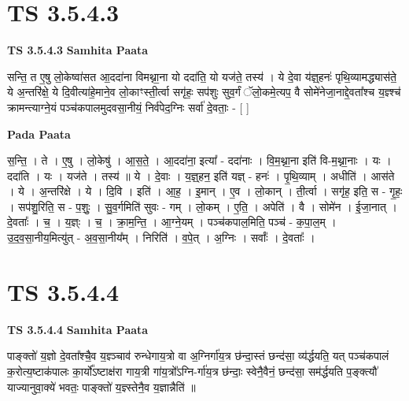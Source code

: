 \documentclass[17pt]{extarticle}
\begin{document}

\section{ TS 3.5.4.3 }

\textbf{TS 3.5.4.3 } \newline
\textbf{Samhita Paata} \newline

सन्ति॒ त ए॒षु लो॒केष्वा॑सत आ॒ददा॑ना विमथ्ना॒ना यो ददा॑ति॒ यो यज॑ते॒ तस्य॑ । ये दे॒वा य॑ज्ञ्॒हनः॑ पृथि॒व्यामद्ध्यास॑ते॒ ये अ॒न्तरि॑क्षे॒ ये दि॒वीत्या॑हे॒माने॒व लो॒काꣳस्ती॒र्त्वा सगृ॑हः॒ सप॑शुः सुव॒र्गं ॅलो॒कमे॒त्यप॒ वै सोमे॑नेजा॒नाद्दे॒वता᳚श्च य॒ज्ञ्श्च॑ क्रामन्त्याग्ने॒यं पञ्च॑कपालमुदवसा॒नीयं॒ निर्व॑पेद॒ग्निः सर्वा॑ दे॒वताः॒ - [  ] \newline

\textbf{Pada Paata} \newline

स॒न्ति॒ । ते । ए॒षु । लो॒केषु॑ । आ॒स॒ते॒ । आ॒ददा॑ना॒ इत्या᳚ - ददा॑नाः । वि॒म॒थ्ना॒ना इति॑ वि-म॒थ्ना॒नाः । यः । ददा॑ति । यः । यज॑ते । तस्य॑ ॥ ये । दे॒वाः । य॒ज्ञ्॒हन॒ इति॑ यज्ञ् - हनः॑ । पृ॒थि॒व्याम् । अधीति॑ । आस॑ते । ये । अ॒न्तरि॑क्षे । ये । दि॒वि । इति॑ । आ॒ह॒ । इ॒मान् । ए॒व । लो॒कान् । ती॒र्त्वा । सगृ॑ह॒ इति॒ स - गृ॒हः॒ । सप॑शु॒रिति॒ स - प॒शुः॒ । सु॒व॒र्गमिति॑ सुवः - गम् । लो॒कम् । ए॒ति॒ । अपेति॑ । वै । सोमे॑न । ई॒जा॒नात् । दे॒वताः᳚ । च॒ । य॒ज्ञ्ः । च॒ । क्रा॒म॒न्ति॒ । आ॒ग्ने॒यम् । पञ्च॑कपाल॒मिति॒ पञ्च॑ - क॒पा॒ल॒म् । उ॒द॒व॒सा॒नीय॒मित्यु॑त् - अ॒व॒सा॒नीय᳚म् । निरिति॑ । व॒पे॒त् । अ॒ग्निः । सर्वाः᳚ । दे॒वताः᳚ ।  \newline





\section{ TS 3.5.4.4 }

\textbf{TS 3.5.4.4 } \newline
\textbf{Samhita Paata} \newline

पाङ्क्तो॑ य॒ज्ञो दे॒वता᳚श्चै॒व य॒ज्ञ्ञ्चाव॑ रुन्धेगाय॒त्रो वा अ॒ग्निर्गा॑य॒त्र छ॑न्दा॒स्तं छन्द॑सा॒ व्य॑र्द्धयति॒ यत् पञ्च॑कपालं क॒रोत्य॒ष्टाक॑पालः का॒र्यो᳚ऽष्टाक्ष॑रा गाय॒त्री गा॑य॒त्रो᳚ऽग्नि-र्गा॑य॒त्र छ॑न्दाः॒ स्वेनै॒वैनं॒ छन्द॑सा॒ सम॑र्द्धयति प॒ङ्क्त्यौ॑ याज्यानुवा॒क्ये॑ भवतः॒ पाङ्क्तो॑ य॒ज्ञ्स्तेनै॒व य॒ज्ञान्नैति॑ ॥ \newline
\end{document}
